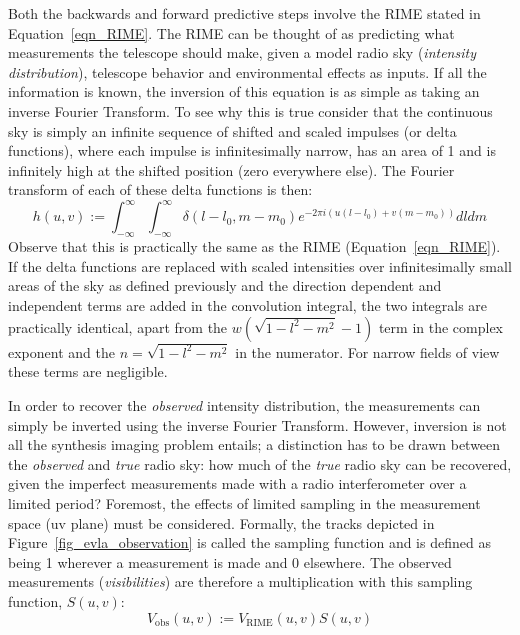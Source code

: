 Both the backwards and forward predictive steps involve the RIME stated in Equation~\ref{eqn_RIME}. The RIME can be thought of as predicting what measurements the telescope should make, given a model radio sky (\emph{intensity distribution}), telescope behavior and environmental effects as inputs. 
If all the information is known, the inversion of this equation is as simple as taking an inverse Fourier Transform. To see why this is true consider that the continuous sky is simply an infinite sequence of 
shifted and scaled impulses (or delta functions), where each impulse is infinitesimally narrow, has an area of 1 and is infinitely high at the shifted position (zero everywhere else). The Fourier transform 
of each of these delta functions is then:
\begin{equation}
 \label{eqn_delta_response}
 h(u,v) := \int_{-\infty}^\infty\int_{-\infty}^\infty \delta(l-l_0,m-m_0)e^{-2\pi i(u(l-l_0)+v(m-m_0))}dldm
\end{equation}
Observe that this is practically the same as the RIME (Equation~\ref{eqn_RIME}). If the delta functions are replaced with scaled intensities over infinitesimally small areas of the sky as defined previously and the direction dependent and
independent terms are added in the convolution integral, the two integrals are practically identical, apart from the $w(\sqrt{1-l^2-m^2}-1)$ term in the complex exponent and the $n = \sqrt{1-l^2-m^2}$ in the numerator. 
For narrow fields of view these terms are negligible.

In order to recover the \emph{observed} intensity distribution, the measurements can simply be inverted using the inverse Fourier Transform. However, inversion is not all the synthesis imaging problem entails; a distinction has to be drawn
between the \emph{observed} and \emph{true} radio sky: how much of the \emph{true} radio sky can be recovered, given the imperfect measurements made with a radio interferometer over a limited period? Foremost, the
effects of limited sampling in the measurement space (uv plane) must be considered. Formally, the tracks depicted in Figure~\ref{fig_evla_observation} is called the sampling function and is defined as being 1 wherever 
a measurement is made and 0 elsewhere. The observed measurements (\emph{visibilities}) are therefore a multiplication with this sampling function, $S(u,v)$:
\begin{equation}
 V_{\text{obs}}(u,v) := V_{\text{RIME}}(u,v)S(u,v)
 \label{eqn_observed_vis}
\end{equation}

